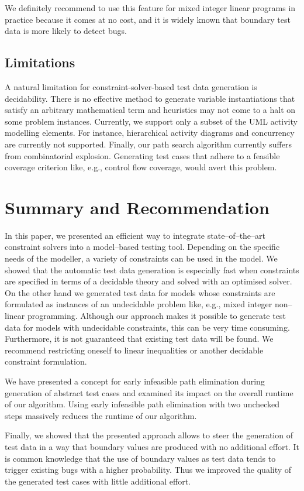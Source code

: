 \documentclass[runningheads,a4paper]{llncs}%
\begin{document}
We definitely recommend to use this feature for mixed integer linear programs in
practice because it comes at no cost, and it is widely known that boundary test
data is more likely to detect bugs.
\subsection{Limitations}
A natural limitation for constraint-solver-based test data generation is
decidability. There is no effective method to generate variable instantiations
that satisfy an arbitrary mathematical term and heuristics may not come to a halt on
some problem instances.
Currently, we support only a subset of the UML activity modelling
elements. For instance, hierarchical activity diagrams and concurrency are currently not
supported. 
Finally, our path search algorithm currently suffers
from combinatorial explosion. Generating test cases that adhere to a feasible
coverage criterion like, e.g., control flow coverage, would avert this problem.

\section{Summary and Recommendation}%
\label{sec:Recommendation}%
In this paper, we presented an efficient way to integrate state--of--the--art constraint
solvers into a model--based testing tool. Depending on the specific needs of the
modeller, a variety of constraints can be used in the model. 
We showed that the automatic test data generation is especially
fast when constraints are specified in terms of a decidable theory and solved
with an optimised solver. On the other hand we 
generated test data for models whose constraints are formulated as instances of
an undecidable problem like, e.g., mixed integer non--linear programming.
Although our approach makes it possible to generate test data for
models with undecidable constraints, this can be very time consuming.
Furthermore, it is not guaranteed that existing test data will be found. 
We recommend restricting
oneself to linear inequalities or another decidable constraint formulation.

We have presented a concept for early infeasible path elimination during
generation of abstract test cases and examined its impact on the overall runtime
of our algorithm. Using early infeasible path elimination with two unchecked
steps massively reduces the runtime of our algorithm.

Finally, we showed that the presented approach allows to steer the
generation of test data in a way that boundary values are produced with no
additional effort. It is common knowledge that the use of boundary values as
test data tends to trigger existing bugs with a higher probability. Thus we
improved the quality of the generated test cases with little additional effort.%

%
%
\end{document}
